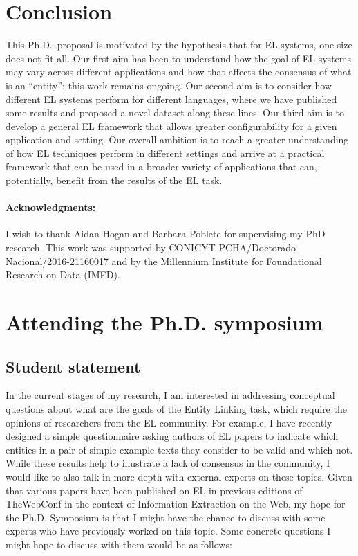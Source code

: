 \documentclass[sigconf]{acmart}
\begin{document}
\section{Conclusion}

This Ph.D.\ proposal is motivated by the hypothesis that for EL systems, one size does not fit all. Our first aim has been to understand how the goal of EL systems may vary across different applications and how that affects the consensus of what is an ``entity''; this work remains ongoing. Our second aim is to consider how different EL systems perform for different languages, where we have published some results and proposed a novel dataset along these lines. Our third aim is to develop a general EL framework that allows greater configurability for a given application and setting. Our overall ambition is to reach a greater understanding of how EL techniques perform in different settings and arrive at a practical framework that can be used in a broader variety of applications that can, potentially, benefit from the results of the EL task.

\paragraph{Acknowledgments:} I wish to thank Aidan Hogan and Barbara Poblete for supervising my PhD research. This work was supported by CONICYT-PCHA/Doctorado Nacional/2016-21160017 and by the Millennium Institute for Foundational Research on Data (IMFD).

%



\appendix

\section{Attending the Ph.D. symposium}

\subsection{Student statement}

In the current stages of my research, I am interested in addressing conceptual questions about what are the goals of the Entity Linking task, which require the opinions of researchers from the EL community. For example, I have recently designed a simple questionnaire asking authors of EL papers to indicate which entities in a pair of simple example texts they consider to be valid and which not. While these results help to illustrate a lack of consensus in the community, I would like to also talk in more depth with external experts on these topics. Given that various papers have been published on EL in previous editions of TheWebConf in the context of Information Extraction on the Web, my hope for the Ph.D. Symposium is that I might have the chance to discuss with some experts who have previously worked on this topic. Some concrete questions I might hope to discuss with them would be as follows:
\end{document}
